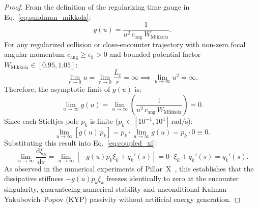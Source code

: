 \documentclass[11pt,a4paper,reqno]{article}
\theoremstyle{plain}
\theoremstyle{definition}
\theoremstyle{remark}
\numberwithin{equation}{section}
\begin{document}
\begin{proof}
From the definition of the regularizing time gauge in Eq.~\eqref{eq:sundman_mikkola}:
\begin{equation}
  g(u) = \frac{1}{u^2 \, c_{\mathrm{ang}} \, W_{\mathrm{Mikkola}}}.
\end{equation}
For any regularized collision or close-encounter trajectory with non-zero focal angular momentum $c_{\mathrm{ang}} \ge \epsilon_h > 0$ and bounded potential factor $W_{\mathrm{Mikkola}} \in [0.95, 1.05]$:
\begin{equation}
  \lim_{r \to 0} u = \lim_{r \to 0} \frac{L_c}{r} = \infty \implies \lim_{u \to \infty} u^2 = \infty.
\end{equation}
Therefore, the asymptotic limit of $g(u)$ is:
\begin{equation}
  \lim_{u \to \infty} g(u) = \lim_{u \to \infty} \left( \frac{1}{u^2 \, c_{\mathrm{ang}} \, W_{\mathrm{Mikkola}}} \right) = 0.
\end{equation}
Since each Stieltjes pole $p_k$ is finite ($p_k \in [10^{-4}, 10^4]\,\mathrm{rad/s}$):
\begin{equation}
  \lim_{u \to \infty} \left[ g(u) \, p_k \right] = p_k \cdot \lim_{u \to \infty} g(u) = p_k \cdot 0 \equiv 0.
\end{equation}
Substituting this result into Eq.~\eqref{eq:coupled_xi}:
\begin{equation}
  \lim_{u \to \infty} \frac{\mathrm{d}\xi_k}{\mathrm{d}s} = \lim_{u \to \infty} \left[ - g(u) p_k \xi_k + q_k'(s) \right] = 0 \cdot \xi_k + q_k'(s) = q_k'(s).
\end{equation}
As observed in the numerical experiments of Pillar~X~\cite{PillarXPreprint}, this establishes that the dissipative stiffness $-g(u) p_k \xi_k$ freezes identically to zero at the encounter singularity, guaranteeing numerical stability and unconditional Kalman--Yakubovich--Popov (KYP) passivity without artificial energy generation.
\end{proof}
\end{document}

